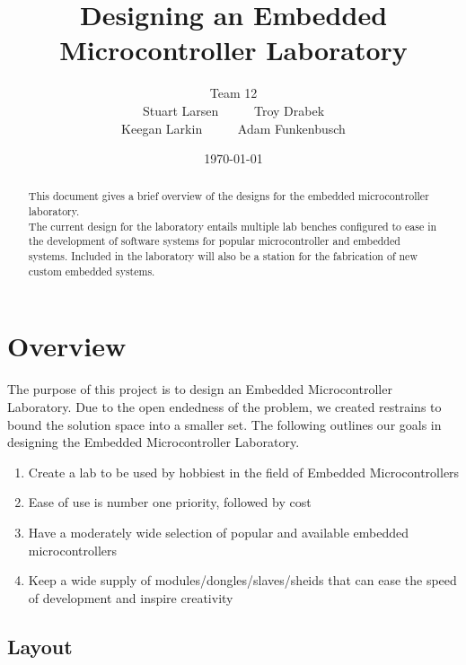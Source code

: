 \documentclass[12pt]{article}
\title{Designing an Embedded Microcontroller Laboratory}
\author{Team 12 \\ Stuart Larsen \ \ \ \ \   Troy Drabek \\ Keegan Larkin \ \ \ \ \   Adam Funkenbusch }
\date{\today}
\begin{document}
\maketitle
\thispagestyle{empty}

\pagebreak
\begin{abstract}

  This document gives a brief overview of the designs for the embedded microcontroller laboratory. \\

  \noindent
  The current design for the laboratory entails multiple lab benches configured to ease in the development of software systems for popular microcontroller and embedded systems. Included in the laboratory will also be a station for the fabrication of new custom embedded systems.

\end{abstract}

\thispagestyle{empty}
\pagebreak

\tableofcontents
\thispagestyle{empty}
\pagebreak
\setcounter{page}{1}


\section{Overview}

The purpose of this project is to design an Embedded Microcontroller Laboratory. Due to the open endedness of the problem, we created restrains to bound the solution space into a smaller set. The following outlines our goals in designing the Embedded Microcontroller Laboratory.

\begin{enumerate}
  \item Create a lab to be used by hobbiest in the field of Embedded Microcontrollers
  \item Ease of use is number one priority, followed by cost
  \item Have a moderately wide selection of popular and available embedded microcontrollers
  \item Keep a wide supply of modules/dongles/slaves/sheids that can ease the speed of development and inspire creativity
\end{enumerate}

\subsection{Layout}
\end{document}
